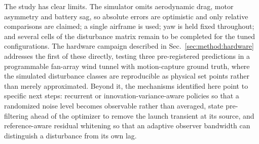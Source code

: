 The study has clear limits. The simulator omits aerodynamic drag, motor asymmetry and
battery sag, so absolute errors are optimistic and only relative comparisons are
claimed; a single airframe is used; yaw is held fixed throughout; and several cells of
the disturbance matrix remain to be completed for the tuned configurations. The hardware
campaign described in Sec.~\ref{sec:method:hardware} addresses the first of these
directly, testing three pre-registered predictions in a programmable fan-array wind
tunnel with motion-capture ground truth, where the simulated disturbance classes are
reproducible as physical set points rather than merely approximated. Beyond it, the
mechanisms identified here point to specific next steps: recurrent or
innovation-variance-aware policies so that a randomized noise level becomes observable
rather than averaged, state pre-filtering ahead of the optimizer to remove the launch
transient at its source, and reference-aware residual whitening so that an adaptive
observer bandwidth can distinguish a disturbance from its own lag.

